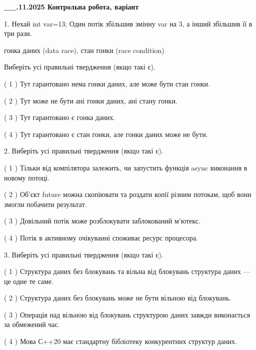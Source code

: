 \documentclass[12pt, ukrainian]{article}
\begin{document}
\newpage
\begin {large}

\textbf{\_\_.11.2025 Контрольна робота, варіант  }\par


{
1. Нехай int var=13; Один потік збільшив змінну var на 3, а інший збільшив її в три рази.

гонка даних (data race), стан гонки (race condition)

Виберіть усі правильні твердження (якщо такі є).\par
\vspace{2mm}
( 1 ) Тут гарантовано нема гонки даних, але може бути стан гонки.%

( 2 ) Тут може не бути ані гонки даних, ані стану гонки.%

( 3 ) Тут гарантовано є гонка даних.%

( 4 ) Тут гарантовано є стан гонки, але гонки даних може не бути.%


2. Виберіть усі правильні твердження (якщо такі є).\par
\vspace{2mm}

( 1 ) Тільки від компілятора залежить, чи запустить функція async виконання в новому потоці.%

( 2 ) Об’єкт future можна скопіювати та роздати копії різним потокам, щоб вони змогли побачити результат.%

( 3 ) Довільний потік може розблокувати заблокований м’ютекс.%

( 4 ) Потік в активному очікуванні споживає ресурс процесора.%


3. Виберіть усі правильні твердження (якщо такі є).\par
\vspace{2mm}

( 1 ) Структура даних без блокувань та вільна від блокувань структура даних --- це одне те саме.%

( 2 ) Структура даних без блокувань може не бути вільною від блокувань.%

( 3 ) Операція над вільною від блокувань структурою даних завжди виконається за обмежений час.%

( 4 ) Мова С++20 має стандартну бібліотеку конкурентних структур даних.%


}
\end{large}
\end{document}
